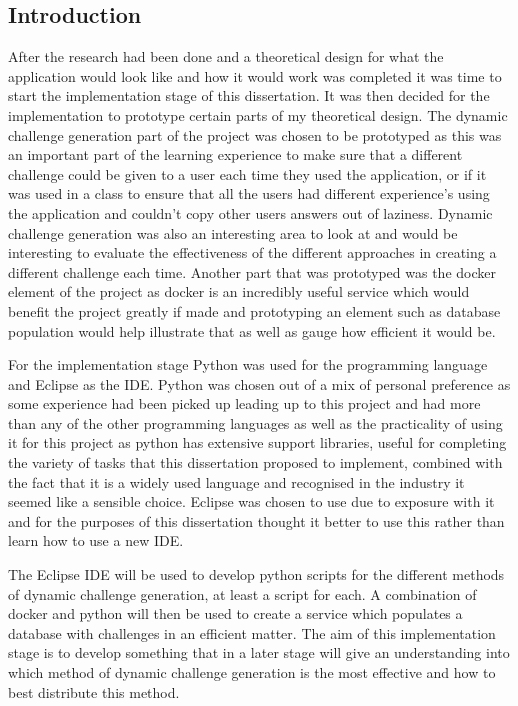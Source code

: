 \documentclass[12pt,a4paper]{article}
\begin{document}
\subsection{Introduction}
After the research had been done and a theoretical design for what the application would look like and how it would work was completed it was time to start the implementation stage of this dissertation. It was then decided for the implementation to prototype certain parts of my theoretical design. The dynamic challenge generation part of the project was chosen to be prototyped as this was an important part of the learning experience to make sure that a different challenge could be given to a user each time they used the application, or if it was used in a class to ensure that all the users had different experience's using the application and couldn't copy other users answers out of laziness. Dynamic challenge generation was also an interesting area to look at and would be interesting to evaluate the effectiveness of the different approaches in creating a different challenge each time. Another part that was prototyped was the docker element of the project as docker is an incredibly useful service which would benefit the project greatly if made and prototyping an element such as database population would help illustrate that as well as gauge how efficient it would be.  

For the implementation stage Python was used for the programming language and Eclipse as the IDE. Python was chosen out of a mix of personal preference as some experience had been picked up leading up to this project and had more than any of the other programming languages as well as the practicality of using it for this project as python has extensive support libraries, useful for completing the variety of tasks that this dissertation proposed to implement, combined with the fact that it is a widely used language and recognised in the industry it seemed like a sensible choice. Eclipse was chosen to use due to exposure with it and for the purposes of this dissertation thought it better to use this rather than learn how to use a new IDE.

The Eclipse IDE will be used to develop python scripts for the different methods of dynamic challenge generation, at least a script for each. A combination of docker and python will then be used to create a service which populates a database with challenges in an efficient matter. The aim of this implementation stage is to develop something that in a later stage will give an understanding into which method of dynamic challenge generation is the most effective and how to best distribute this method.   
\end{document}

